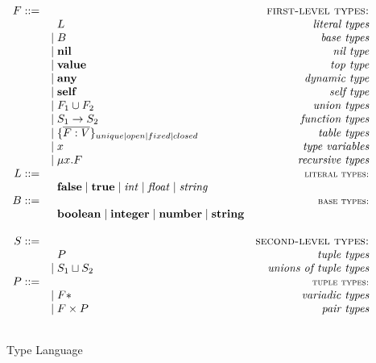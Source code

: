\documentclass[preprint]{sigplanconf}
\newcommand{\Value}{\mathbf{value}}
\newcommand{\Any}{\mathbf{any}}
\newcommand{\Nil}{\mathbf{nil}}
\newcommand{\Self}{\mathbf{self}}
\newcommand{\False}{\mathbf{false}}
\newcommand{\True}{\mathbf{true}}
\newcommand{\Boolean}{\mathbf{boolean}}
\newcommand{\Integer}{\mathbf{integer}}
\newcommand{\Number}{\mathbf{number}}
\newcommand{\String}{\mathbf{string}}
\newcommand{\Void}{\Nil{*}}
\begin{document}
\begin{figure*}[t]
$$
\begin{array}{rlr}
F ::= & & \textsc{first-level types:}\\
& \;\; L & \textit{literal types}\\
& | \; B & \textit{base types}\\
& | \; \Nil & \textit{nil type}\\
& | \; \Value & \textit{top type}\\
& | \; \Any & \textit{dynamic type}\\
& | \; \Self & \textit{self type}\\
& | \; F_{1} \cup F_{2} & \textit{union types}\\
& | \; S_{1} \rightarrow S_{2} & \textit{function types}\\
& | \; \{\overline{F:V}\}_{unique|open|fixed|closed} & \textit{table types}\\
& |\; x & \textit{type variables}\\
& | \; \mu x.F & \textit{recursive types}\\
L ::= & & \textsc{{\small literal types:}}\\
& \;\; \False \; | \; \True \; | \; {\it int} \; | \; {\it float} \; | \; {\it string} &\\
B ::= & & \textsc{{\small base types:}}\\
& \;\; \Boolean \; | \; \Integer \; | \; \Number \; | \; \String &\\\\
S ::= & & \textsc{second-level types:}\\
& \;\; P & \textit{tuple types}\\
& | \; S_{1} \sqcup S_{2} & \textit{unions of tuple types}\\
P ::= & & \textsc{{\small tuple types:}}\\
& | \; F{*} & \textit{variadic types}\\
& | \; F \times P & \textit{pair types}\\\\
\end{array}
$$
\caption{Type Language}
\label{fig:typelang}
\end{figure*}
\end{document}
